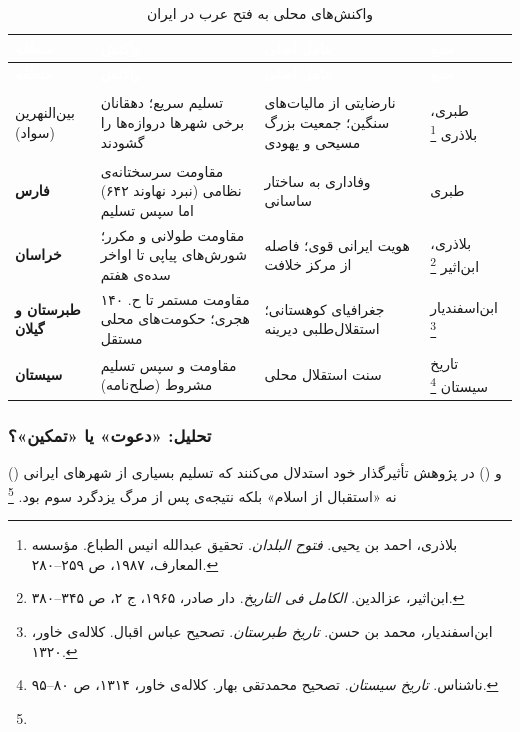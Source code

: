 \begin{longtable}{
  >{\raggedleft\arraybackslash\bfseries}p{2.5cm}
  >{\raggedleft\arraybackslash}p{4cm}
  >{\raggedleft\arraybackslash}p{3cm}
  >{\raggedleft\arraybackslash}p{3cm}}
\caption{واکنش‌های محلی به فتح عرب در ایران}\label{tab:ch04-arab-reactions}\\
\toprule
\rowcolor{PrimaryDeep}
\textcolor{white}{\textbf{منطقه}} &
\textcolor{white}{\textbf{واکنش}} &
\textcolor{white}{\textbf{عامل اصلی}} &
\textcolor{white}{\textbf{منبع}} \\
\midrule
\endfirsthead
\toprule
\rowcolor{PrimaryDeep}
\textcolor{white}{\textbf{منطقه}} &
\textcolor{white}{\textbf{واکنش}} &
\textcolor{white}{\textbf{عامل اصلی}} &
\textcolor{white}{\textbf{منبع}} \\
\midrule
\endhead
\bottomrule
\endlastfoot

بین‌النهرین (سواد) &
تسلیم سریع؛ دهقانان برخی شهرها دروازه‌ها را گشودند &
نارضایتی از مالیات‌های سنگین؛ جمعیت بزرگ مسیحی و یهودی &
طبری، بلاذری%
\footnote{بلاذری، احمد بن یحیی. \textit{فتوح البلدان}. تحقیق عبدالله انیس الطباع. مؤسسه المعارف، ۱۹۸۷، ص ۲۵۹--۲۸۰.} \\
\rowcolor{NeutralLight}
فارس &
مقاومت سرسختانه‌ی نظامی (نبرد نهاوند ۶۴۲) اما سپس تسلیم &
وفاداری به ساختار ساسانی &
طبری \\
خراسان &
مقاومت طولانی و مکرر؛ شورش‌های پیاپی تا اواخر سده‌ی هفتم &
هویت ایرانی قوی؛ فاصله از مرکز خلافت &
بلاذری، ابن‌اثیر%
\footnote{ابن‌اثیر، عزالدین. \textit{الکامل فی التاریخ}. دار صادر، ۱۹۶۵، ج ۲، ص ۳۴۵--۳۸۰.} \\
\rowcolor{NeutralLight}
طبرستان و گیلان &
مقاومت مستمر تا ح. ۱۴۰ هجری؛ حکومت‌های محلی مستقل &
جغرافیای کوهستانی؛ استقلال‌طلبی دیرینه &
ابن‌اسفندیار%
\footnote{ابن‌اسفندیار، محمد بن حسن. \textit{تاریخ طبرستان}. تصحیح عباس اقبال. کلاله‌ی خاور، ۱۳۲۰.} \\
سیستان &
مقاومت و سپس تسلیم مشروط (صلح‌نامه) &
سنت استقلال محلی &
تاریخ سیستان%
\footnote{ناشناس. \textit{تاریخ سیستان}. تصحیح محمدتقی بهار. کلاله‌ی خاور، ۱۳۱۴، ص ۸۰--۹۵.} \\

\end{longtable}

\subsubsection{تحلیل: «دعوت» یا «تمکین»؟}

 () و  () در پژوهش تأثیرگذار خود استدلال می‌کنند که تسلیم بسیاری از شهرهای ایرانی نه «استقبال از اسلام» بلکه نتیجه‌ی  پس از مرگ یزدگرد سوم بود.%
\footnote{}

